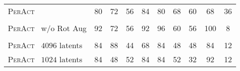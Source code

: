\documentclass{article}
\newcommand{\model}{\textsc{PerAct}}
\begin{document}
\begin{table}[!b]
\begin{tabular}{lccccccccc}
\cline{1-10} \\[-4pt]
\model~                & 80                                                    & 72                                                    & 56                                                         & 84                                                       & 80                                                  & 68                                                      & 60                                                  & 68                                                   & 36                                                     \\& \multicolumn{1}{l}{}                                  & \multicolumn{1}{l}{}                                  & \multicolumn{1}{l}{}                                       & \multicolumn{1}{l}{}                                     & \multicolumn{1}{l}{}                                & \multicolumn{1}{l}{} \\[-0.6em]
\rowcolor[rgb]{0.898,1.0,0.953} \model~ w/o Rot Aug  & 92                                                    & 72                                                    & 56                                                         & 92                                                       & 96                                                  & 60                                                      & 56                                                  & 100                                                  & 8                                                      \\
& \multicolumn{1}{l}{}                                  & \multicolumn{1}{l}{}                                  & \multicolumn{1}{l}{}                                       & \multicolumn{1}{l}{}                                     & \multicolumn{1}{l}{}                                & \multicolumn{1}{l}{} \\[-0.6em]
\rowcolor[rgb]{0.9,1.0,0.9} \model~ $4096$ latents & 84                                                    & 88                                                    & 44                                                         & 68                                                       & 84                                                  & 48                                                      & 48                                                  & 84                                                   & 12                                                     \\
\rowcolor[rgb]{0.9,1.0,0.9} \model~ $1024$ latents & 84                                                    & 48                                                    & 52                                                         & 84                                                       & 84                                                  & 52                                                      & 32                                                  & 92                                                   & 12                                                     \\

\end{tabular}
\end{table}
\end{document}
